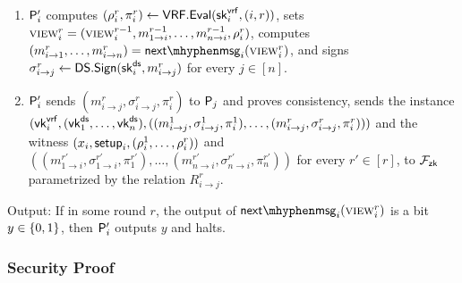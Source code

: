 \begin{protocol}[Protocol $\Pi' = (\Party'_1,\ldots, \Party'_n)$ \Inote{$n$?}]
     \begin{enumerate}
     	\item $\mathsf{P}_i'$ computes $(\rho_i^r,\pi_i^r)\gets\mathsf{VRF.Eval}(\mathsf{sk}^{\mathsf{vrf}}_i,(i,r))$, sets $\textsc{view}_i^r=(\textsc{view}_i^{r-1},m_{1\to i}^{r-1},\ldots,m_{n\to i}^{r-1},\rho_i^r)$, computes $(m^r_{i\to 1}, \ldots, m^r_{i\to n})=\nextmsg_i(\view_i^r)$, and signs $\sigma_{i\to j}^r\gets\mathsf{DS.Sign}(\mathsf{sk}^{\mathsf{ds}}_i,m_{i\to j}^r)$ for every $j\in[n]$.
     	
     	\item  $\mathsf{P}_i'$ sends $(m_{i\to j}^r,\sigma_{i\to j}^r,\pi_i^r)$ to $\mathsf{P}_j$ and proves consistency, \ie sends the instance $(\mathsf{vk}^{\mathsf{vrf}}_i,(\mathsf{vk}^{\mathsf{ds}}_1,\ldots,\mathsf{vk}^{\mathsf{ds}}_n),((m_{i\to j}^1,\sigma_{i\to j}^1,\pi_i^1),\ldots,(m_{i\to j}^r,\sigma_{i\to j}^r,\pi_i^r)))$ and the witness $(x_i,\mathsf{setup}_i,(\rho_i^1,\ldots,\rho_i^r))$ and $((m^{r'}_{1\to i},\sigma^{r'}_{1\to i},\pi^{r'}_1),\ldots,(m^{r'}_{n\to i},\sigma^{r'}_{n\to i},\pi^{r'}_n))$ for every $r'\in[r]$, to $\mathcal{F}_\mathsf{zk}$ parametrized by the relation $R_{i\to j}^r$.

 \end{enumerate}
     	


    \item[Output:]    If in some round $r$, the output of $\nextmsg_i(\view_i^r)$ is a bit $y\in\{0,1\}$, then $\mathsf{P}_i'$ outputs $y$ and halts. 
\end{protocol}

\subsubsection{Security Proof}


